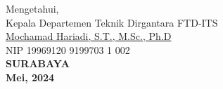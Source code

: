 \vspace{\fill}

\begin{center}
  Mengetahui,\\
  Kepala Departemen Teknik Dirgantara FTD-ITS\\
  \vspace{10ex}
  \underline{Mochamad Hariadi, S.T., M.Sc., Ph.D }\\
  NIP 19969120 9199703 1 002\\
  \vspace{10ex}
  \textbf{SURABAYA} \\
  \textbf{Mei, 2024}
\end{center}
\endgroup
